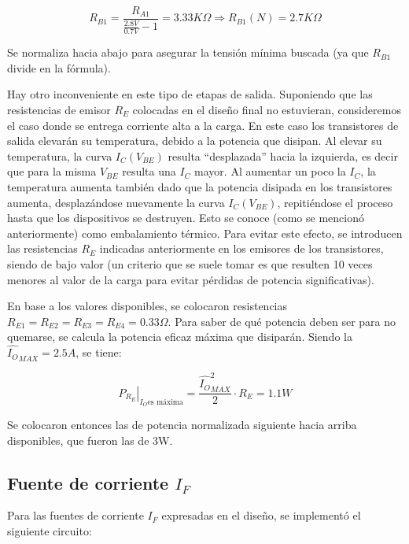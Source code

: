 \[
R_{B1} = \frac{R_{A1}}{\frac{2.8V}{0.7V} - 1} = 3.33K\Omega \Longrightarrow R_{B1}(N) = 2.7K\Omega
\]

Se normaliza hacia abajo para asegurar la tensión mínima buscada (ya que $R_{B1}$ divide en la fórmula).\par
Hay otro inconveniente en este tipo de etapas de salida. Suponiendo que las resistencias de emisor $R_E$ colocadas en el diseño final no estuvieran, consideremos el caso donde se entrega corriente alta a la carga. En este caso los transistores de salida elevarán su temperatura, debido a la potencia que disipan. Al elevar su temperatura, la curva $I_C(V_{BE})$ resulta ``desplazada'' hacia la izquierda, es decir que para la misma $V_{BE}$ resulta una $I_C$ mayor. Al aumentar un poco la $I_C$, la temperatura aumenta también dado que la potencia disipada en los transistores aumenta, desplazándose nuevamente la curva $I_C(V_{BE})$, repitiéndose el proceso hasta que los dispositivos se destruyen. Esto se conoce (como se mencionó anteriormente) como embalamiento térmico. Para evitar este efecto, se introducen las resistencias $R_E$ indicadas anteriormente en los emisores de los transistores, siendo de bajo valor (un criterio que se suele tomar es que resulten 10 veces menores al valor de la carga para evitar pérdidas de potencia significativas).\par
En base a los valores disponibles, se colocaron resistencias $R_{E1} = R_{E2} = R_{E3} = R_{E4} = 0.33\Omega$. Para saber de qué potencia deben ser para no quemarse, se calcula la potencia eficaz máxima que disiparán. Siendo la $\hat{I_O}_{MAX} = 2.5A$, se tiene:

\[
\left. P_{R_E} \right|_{I_O \textrm{es máxima}} = \frac{\hat{I_O}_{MAX}^2}{2} \cdot R_E = 1.1W
\]  

Se colocaron entonces las de potencia normalizada siguiente hacia arriba disponibles, que fueron las de 3W.

\subsection{Fuente de corriente $I_F$}

Para las fuentes de corriente $I_F$ expresadas en el diseño, se implementó el siguiente circuito:

